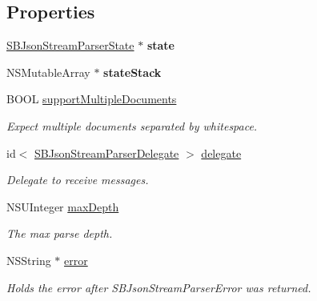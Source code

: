 \subsection*{Properties}
\begin{DoxyCompactItemize}
\item 
\hypertarget{interface_s_b_json_stream_parser_aa0bce27e23cb3e352564b5f57876f0e5}{\hyperlink{interface_s_b_json_stream_parser_state}{S\-B\-Json\-Stream\-Parser\-State} $\ast$ {\bfseries state}}\label{interface_s_b_json_stream_parser_aa0bce27e23cb3e352564b5f57876f0e5}

\item 
\hypertarget{interface_s_b_json_stream_parser_a7f7df2e29f60e02d63888e4e8c3ee5b0}{N\-S\-Mutable\-Array $\ast$ {\bfseries state\-Stack}}\label{interface_s_b_json_stream_parser_a7f7df2e29f60e02d63888e4e8c3ee5b0}

\item 
B\-O\-O\-L \hyperlink{interface_s_b_json_stream_parser_afd976c605b67edbb8b7abbebcc5b4093}{support\-Multiple\-Documents}
\begin{DoxyCompactList}\small\item\em Expect multiple documents separated by whitespace. \end{DoxyCompactList}\item 
id$<$ \hyperlink{protocol_s_b_json_stream_parser_delegate-p}{S\-B\-Json\-Stream\-Parser\-Delegate} $>$ \hyperlink{interface_s_b_json_stream_parser_a1a4e90ce1ca9b55e7696db77ef6bf20c}{delegate}
\begin{DoxyCompactList}\small\item\em Delegate to receive messages. \end{DoxyCompactList}\item 
N\-S\-U\-Integer \hyperlink{interface_s_b_json_stream_parser_a1c6f49cb5dd676452994d96498bb5a3f}{max\-Depth}
\begin{DoxyCompactList}\small\item\em The max parse depth. \end{DoxyCompactList}\item 
\hypertarget{interface_s_b_json_stream_parser_a49c6e710bc367cdc627a4152706f1008}{N\-S\-String $\ast$ \hyperlink{interface_s_b_json_stream_parser_a49c6e710bc367cdc627a4152706f1008}{error}}\label{interface_s_b_json_stream_parser_a49c6e710bc367cdc627a4152706f1008}

\begin{DoxyCompactList}\small\item\em Holds the error after S\-B\-Json\-Stream\-Parser\-Error was returned. \end{DoxyCompactList}\end{DoxyCompactItemize}


